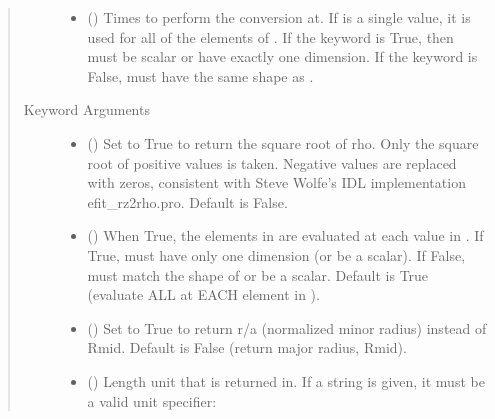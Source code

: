 \documentclass[letterpaper,10pt,english]{sphinxmanual}
\begin{document}
\begin{fulllineitems}
\begin{fulllineitems}
\begin{quote}
\begin{description}
\begin{itemize}
\item {} 
 () \textendash{} Times to perform the conversion at.
If  is a single value, it is used for all of the elements of
. If the  keyword is True, then  must be scalar
or have exactly one dimension. If the  keyword is False,
 must have the same shape as .

\end{itemize}

\item[{Keyword Arguments}] \leavevmode\begin{itemize}
\item {} 
 () \textendash{} Set to True to return the square root of rho. Only
the square root of positive values is taken. Negative values are
replaced with zeros, consistent with Steve Wolfe’s IDL
implementation efit\_rz2rho.pro. Default is False.

\item {} 
 () \textendash{} When True, the elements in  are evaluated at
each value in . If True,  must have only one dimension (or
be a scalar). If False,  must match the shape of  or be
a scalar. Default is True (evaluate ALL  at EACH element in
).

\item {} 
 () \textendash{} Set to True to return r/a (normalized minor radius)
instead of Rmid. Default is False (return major radius, Rmid).

\item {} 
 () \textendash{} 
Length unit that  is returned in.
If a string is given, it must be a valid unit specifier:
\begin{quote}



\end{quote}
\end{itemize}
\end{description}
\end{quote}
\end{fulllineitems}
\end{fulllineitems}
\end{document}
